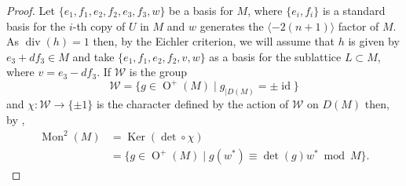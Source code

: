 \documentclass[12pt, a4paper]{article}
\newcommand{\la}{\langle}
\newcommand{\ra}{\rangle}
\newcommand{\wc}{\mathcal{W}}
\newcommand{\opn}{\operatorname}
\begin{document}
\begin{proof}
Let $\{ e_1, f_1, e_2, f_2, e_3, f_3, w \}$ be a basis for $M$, where $\{e_i, f_i\}$ is a standard basis for the $i$-th copy of $U$ in $M$ and $w$ generates the $\la -2(n+1) \ra$ factor of $M$.
As $\opn{div}(h)=1$ then, by the Eichler criterion, we will assume that $h$ is given by $e_3 + d f_3 \in M$ and take $\{ e_1, f_1, e_2, f_2, v, w \}$
as a basis for the sublattice $L \subset M$, where $v=e_3 - df_3$.
If $\wc$ is the group
\[
\wc = \{g \in \opn{O}^+(M) \mid g_{\vert D(M)} = \pm \opn{id} \}
\]
and $\chi : \wc \rightarrow \{ \pm 1 \}$ is the character defined by the action of $\wc$ on $D(M)$ then, by \cite{Mongardi},
\begin{align}\label{mongp}
  \opn{Mon}^2(M)
  & =\opn{Ker}(\opn{det} \circ \chi) \\
  & = \{ g \in \opn{O}^+(M) \mid g(w^*) \equiv \opn{det}(g) w^* \bmod{ M} \}. \nonumber
\end{align}


\end{proof}
\end{document}
